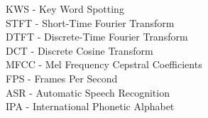 KWS - Key Word Spotting\\
STFT - Short-Time Fourier Transform\\
DTFT - Discrete-Time Fourier Transform\\
DCT - Discrete Cosine Transform\\
MFCC - Mel Frequency Cepstral Coefficients\\
FPS - Frames Per Second\\
ASR - Automatic Speech Recognition\\
IPA - International Phonetic Alphabet\\